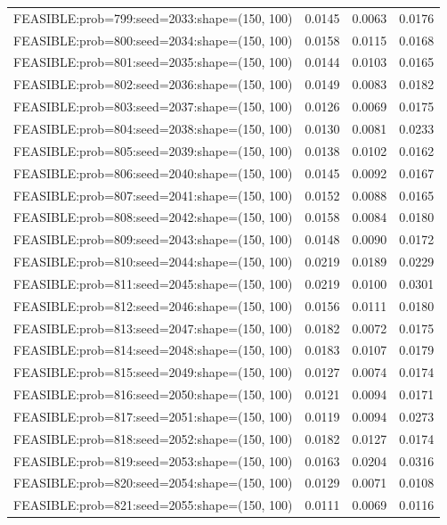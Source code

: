 \begin{longtable}{lccc}
FEASIBLE:prob=799:seed=2033:shape=(150, 100) &   0.0145 & 0.0063 & 0.0176 \\
FEASIBLE:prob=800:seed=2034:shape=(150, 100) &   0.0158 & 0.0115 & 0.0168 \\
FEASIBLE:prob=801:seed=2035:shape=(150, 100) &   0.0144 & 0.0103 & 0.0165 \\
FEASIBLE:prob=802:seed=2036:shape=(150, 100) &   0.0149 & 0.0083 & 0.0182 \\
FEASIBLE:prob=803:seed=2037:shape=(150, 100) &   0.0126 & 0.0069 & 0.0175 \\
FEASIBLE:prob=804:seed=2038:shape=(150, 100) &   0.0130 & 0.0081 & 0.0233 \\
FEASIBLE:prob=805:seed=2039:shape=(150, 100) &   0.0138 & 0.0102 & 0.0162 \\
FEASIBLE:prob=806:seed=2040:shape=(150, 100) &   0.0145 & 0.0092 & 0.0167 \\
FEASIBLE:prob=807:seed=2041:shape=(150, 100) &   0.0152 & 0.0088 & 0.0165 \\
FEASIBLE:prob=808:seed=2042:shape=(150, 100) &   0.0158 & 0.0084 & 0.0180 \\
FEASIBLE:prob=809:seed=2043:shape=(150, 100) &   0.0148 & 0.0090 & 0.0172 \\
FEASIBLE:prob=810:seed=2044:shape=(150, 100) &   0.0219 & 0.0189 & 0.0229 \\
FEASIBLE:prob=811:seed=2045:shape=(150, 100) &   0.0219 & 0.0100 & 0.0301 \\
FEASIBLE:prob=812:seed=2046:shape=(150, 100) &   0.0156 & 0.0111 & 0.0180 \\
FEASIBLE:prob=813:seed=2047:shape=(150, 100) &   0.0182 & 0.0072 & 0.0175 \\
FEASIBLE:prob=814:seed=2048:shape=(150, 100) &   0.0183 & 0.0107 & 0.0179 \\
FEASIBLE:prob=815:seed=2049:shape=(150, 100) &   0.0127 & 0.0074 & 0.0174 \\
FEASIBLE:prob=816:seed=2050:shape=(150, 100) &   0.0121 & 0.0094 & 0.0171 \\
FEASIBLE:prob=817:seed=2051:shape=(150, 100) &   0.0119 & 0.0094 & 0.0273 \\
FEASIBLE:prob=818:seed=2052:shape=(150, 100) &   0.0182 & 0.0127 & 0.0174 \\
FEASIBLE:prob=819:seed=2053:shape=(150, 100) &   0.0163 & 0.0204 & 0.0316 \\
FEASIBLE:prob=820:seed=2054:shape=(150, 100) &   0.0129 & 0.0071 & 0.0108 \\
FEASIBLE:prob=821:seed=2055:shape=(150, 100) &   0.0111 & 0.0069 & 0.0116 \\

\end{longtable}
